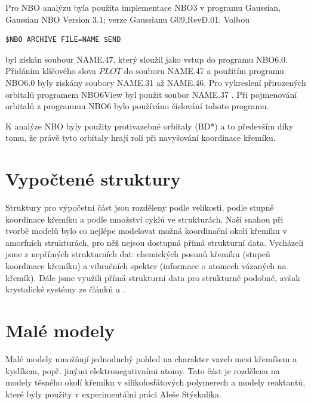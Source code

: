 \documentclass[
digital, %
table,   %
lof,     %
lot,     %
oneside,
]{fithesis3}
\begin{document}
Pro NBO analýzu byla použita implementace NBO3 v programu Gaussian, Gaussian NBO Version 3.1; verze Gaussianu G09,RevD.01. Volbou \begin{lstlisting}[frame=single]
$NBO ARCHIVE FILE=NAME $END
\end{lstlisting}
byl získán soubour NAME.47, který sloužil jako vstup do programu NBO6.0. Přidáním klíčového slova $PLOT$ do souboru NAME.47 a použitím programu NBO6.0 byly ziskány soubory NAME.31 až NAME.46. Pro vykreslení přirozených orbitalů programem NBO6View byl použit soubor NAME.37 \cite{doi:10.1002/jcc.23266}. Při pojmenování orbitalů z programmu NBO6 bylo používáno číslování tohoto programu.

K analýze NBO byly použity protivazebné orbitaly (BD*) a to především díky tomu, že právě tyto orbitaly hrají roli při navyšování koordinace křemíku.

\section{Vypočtené struktury}\label{vypoctene_struktury}
Struktury pro výpočetní část jsou rozděleny podle velikosti, podle stupně koordinace křemíku a podle množství cyklů ve strukturách. Naší snahou při tvorbě modelů bylo co nejlépe modelovat možná koordinační okolí křemíku v amorfních strukturách, pro něž nejsou dostupná přímá strukturní data. Vycházeli jsme z nepřímých strukturních dat: chemických posunů křemíku (stupeň koordinace křemíku) a vibračních spekter (informace o atomech vázaných na křemík). Dále jsme využili přímá strukturní data pro strukturně podobné, avšak krystalické systémy ze článků \cite{C3NJ00721A} a \cite{rtg_4_pinkas}.

\section{Malé modely}
Malé modely umožňují jednoduchý pohled na charakter vazeb mezi křemíkem a kyslíkem, popř. jinými elektronegativními atomy. Tato část je rozdělena na modely těsného okolí křemíku v silikofosfátových polymerech a modely reaktantů, které byly použity v experimentální práci Aleše Stýskalíka.
\end{document}
